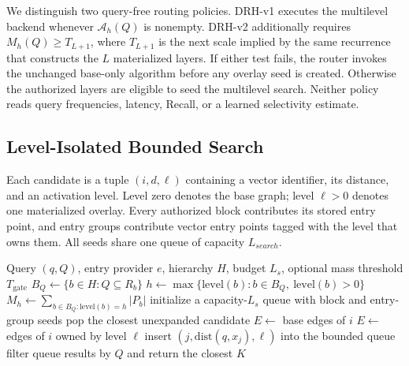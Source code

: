 \documentclass[sigconf,review,anonymous]{acmart}
\begin{document}
We distinguish two query-free routing policies. DRH-v1 executes the
multilevel backend whenever $\mathcal{A}_h(Q)$ is nonempty. DRH-v2 additionally
requires $M_h(Q)\ge T_{L+1}$, where $T_{L+1}$ is the next scale implied by the
same recurrence that constructs the $L$ materialized layers. If either test
fails, the router invokes the unchanged base-only algorithm before any overlay
seed is created. Otherwise the authorized layers are eligible to seed the
multilevel search. Neither policy reads query frequencies, latency, Recall,
or a learned selectivity estimate.

\subsection{Level-Isolated Bounded Search}
Each candidate is a tuple $(i,d,\ell)$ containing a vector identifier, its
distance, and an activation level.  Level zero denotes the base graph; level
$\ell>0$ denotes one materialized overlay.  Every authorized block contributes
its stored entry point, and entry groups contribute vector entry points tagged
with the level that owns them.  All seeds share one queue of capacity
$L_{search}$.

\begin{algorithm}[t]
\caption{Level-isolated multilevel query}
\label{alg:query}
\begin{algorithmic}[1]
\Require Query $(q,Q)$, entry provider $e$, hierarchy $H$, budget $L_s$,
optional mass threshold $T_{\mathrm{gate}}$
\State $B_Q\gets\{b\in H:Q\subseteq R_b\}$
  \State \Return {}
\EndIf
\State $h\gets\max\{\mathrm{level}(b):b\in B_Q,\ \mathrm{level}(b)>0\}$
\State $M_h\gets\sum_{b\in B_Q:\mathrm{level}(b)=h}|P_b|$
  \State \Return {}
\EndIf
\State initialize a capacity-$L_s$ queue with block and entry-group seeds
  \State pop the closest unexpanded candidate
    \State $E\gets$ base edges of $i$
  \Else
    \State $E\gets$ edges of $i$ owned by level $\ell$
  \EndIf
      \State insert $(j,\mathrm{dist}(q,x_j),\ell)$ into the bounded queue
    \EndIf
  \EndFor
\EndWhile
\State filter queue results by $Q$ and return the closest $K$
\end{algorithmic}
\end{algorithm}
\end{document}
